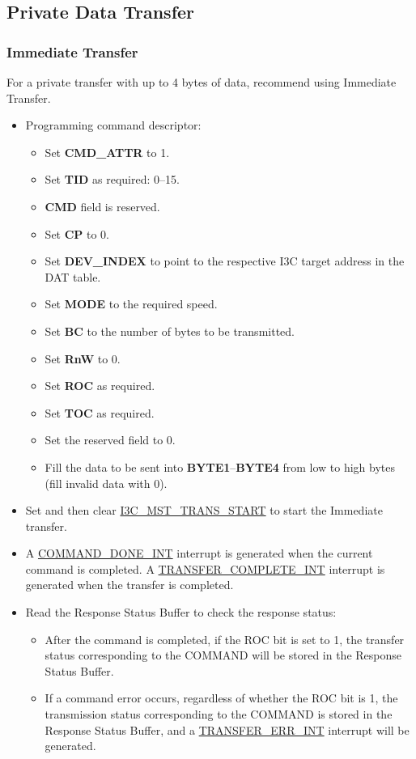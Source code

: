 \documentclass[main\_\_EN.tex]{subfiles}
\begin{document}
\subsection{Private Data Transfer}

\subsubsection{Immediate Transfer}
For a private transfer with up to 4 bytes of data, recommend using Immediate Transfer.

\begin{itemize}
    \item Programming command descriptor:
    \begin{itemize}
        \item Set \textbf{CMD\_ATTR} to 1.
        \item Set \textbf{TID} as required: 0–15.
        \item \textbf{CMD} field is reserved.
        \item Set \textbf{CP} to 0.
        \item Set \textbf{DEV\_INDEX} to point to the respective I3C target address in the DAT table.
        \item Set \textbf{MODE} to the required speed.
        \item Set \textbf{BC} to the number of bytes to be transmitted.
        \item Set \textbf{RnW} to 0.
        \item Set \textbf{ROC} as required.
        \item Set \textbf{TOC} as required.
        \item Set the reserved field to 0.
        \item Fill the data to be sent into \textbf{BYTE1}–\textbf{BYTE4} from low to high bytes (fill invalid data with 0).
    \end{itemize}
    \item Set and then clear \hyperref[fielddesc:I3CMSTREGTRANSSTART]{I3C\_MST\_TRANS\_START} to start the Immediate transfer.
    \item A \hyperref[int:COMMANDDONEINT]{COMMAND\_DONE\_INT} interrupt is generated when the current command is completed. A \hyperref[int:TRANSFERCOMPLETEINT]{TRANSFER\_COMPLETE\_INT} interrupt is generated when the transfer is completed.
    \item Read the Response Status Buffer to check the response status:
    \begin{itemize}
        \item After the command is completed, if the ROC bit is set to 1, the transfer status corresponding to the COMMAND will be stored in the Response Status Buffer.
        \item If a command error occurs, regardless of whether the ROC bit is 1, the transmission status corresponding to the COMMAND is stored in the Response Status Buffer, and a \hyperref[int:TRANSFERERRINT]{TRANSFER\_ERR\_INT} interrupt will be generated.
    \end{itemize}
\end{itemize}
\end{document}
